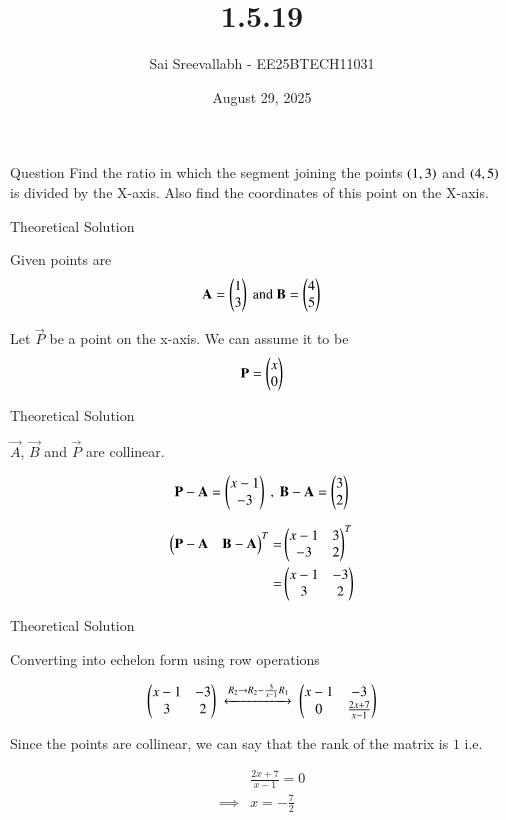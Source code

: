 \documentclass{beamer}
\title 
{1.5.19}
\date{August 29, 2025}
\author 
{Sai Sreevallabh - EE25BTECH11031}
\begin{document}
\frame{\titlepage}
\begin{frame}{Question}
Find the ratio in which the segment joining the points $\left(1,3\right)$ and $\left(4,5\right)$ is divided by the X-axis. Also find the coordinates of this point on the X-axis.
\end{frame}



\begin{frame}{Theoretical Solution}

Given points are\\
\begin{align}
    \mathbf{A}=\begin{pmatrix}1\\3\end{pmatrix} \ \text{and}\  \mathbf{B}=\begin{pmatrix}4\\5\end{pmatrix}
\end{align}

Let $\vec{P}$ be a point on the x-axis. We can assume it to be\\

\begin{align}
    \mathbf{P}=\begin{pmatrix}x\\0\end{pmatrix}
\end{align}

\end{frame}


\begin{frame}{Theoretical Solution}

$\vec{A}$, $\vec{B}$ and $\vec{P}$ are collinear. 

\begin{align}
    \vec{P}-\vec{A}=\myvec{x-1 \\ -3} \ , \ 
    \vec{B}-\vec{A}=\myvec{3\\2}  
\end{align}

\begin{align}
    \begin{pmatrix}\mathbf{P}-\mathbf{A} & \mathbf{B}-\mathbf{A}\end{pmatrix}^T =& \begin{pmatrix}x-1 & 3\\ -3 & 2\end{pmatrix}^T\\
    =& \begin{pmatrix}x-1 & -3 \\ 3 & 2\end{pmatrix}
\end{align}

\end{frame}

\begin{frame}{Theoretical Solution}

Converting into echelon form using row operations

\begin{align*}
    \begin{pmatrix}x-1 & -3 \\ 3 & 2\end{pmatrix}\ \xleftrightarrow[]{R_2 \to R_2-\frac{3}{x-1}R_1} \  \begin{pmatrix}x-1 & -3 \\ 0 & \frac{2x+7}{x-1}\end{pmatrix}
\end{align*}

Since the points are collinear, we can say that the rank of the matrix is $1$ i.e. 

\begin{align}
    &\frac{2x+7}{x-1} = 0\\
    \implies& x=-\frac{7}{2}
\end{align}

\end{frame}
\end{document}
